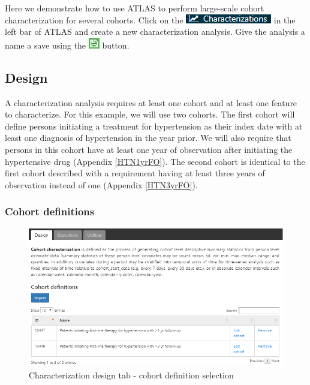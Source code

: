 \documentclass[11pt]{book}
\theoremstyle{definition}
\theoremstyle{definition}
\theoremstyle{definition}
\theoremstyle{remark}
\begin{document}
Here we demonstrate how to use ATLAS to perform large-scale cohort characterization for several cohorts. Click on the \includegraphics{images/Characterization/atlasCharacterizationMenuItem.png} in the left bar of ATLAS and create a new characterization analysis. Give the analysis a name a save using the \includegraphics{images/PopulationLevelEstimation/save.png} button.

\hypertarget{design}{%
\subsection{Design}\label{design}}

A characterization analysis requires at least one cohort and at least one feature to characterize. For this example, we will use two cohorts. The first cohort will define persons initiating a treatment for hypertension as their index date with at least one diagnosis of hypertension in the year prior. We will also require that persons in this cohort have at least one year of observation after initiating the hypertensive drug (Appendix \ref{HTN1yrFO}). The second cohort is identical to the first cohort described with a requirement having at least three years of observation instead of one (Appendix \ref{HTN3yrFO}).

\hypertarget{cohort-definitions-1}{%
\subsubsection*{Cohort definitions}\label{cohort-definitions-1}}

\begin{figure}

{\centering \includegraphics[width=1\linewidth]{images/Characterization/atlasCharacterizationCohortSelection} 

}

\caption{Characterization design tab - cohort definition selection}\label{fig:atlasCharacterizationCohortSelection}
\end{figure}
\end{document}
